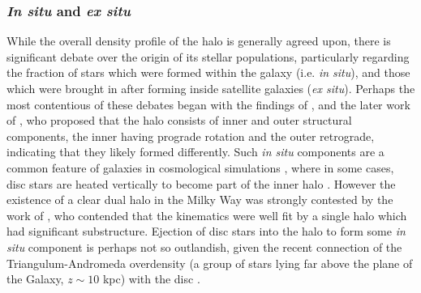 \subsubsection{\emph{In situ} and \emph{ex situ}}
While the overall density profile of the halo is generally agreed upon, there is significant debate over the origin of its stellar populations, particularly regarding the fraction of stars which were formed within the galaxy (i.e. \emph{in situ}), and those which were brought in after forming inside satellite galaxies (\emph{ex situ}). Perhaps the most contentious of these debates began with the findings of \citet{2007Natur.450.1020C}, and the later work of \citet{2012ApJ...746...34B}, who proposed that the halo consists of inner and outer structural components, the inner having prograde rotation and the outer retrograde, indicating that they likely formed differently. Such \emph{in situ} components are a common feature of galaxies in cosmological simulations \citep[e.g.][]{2011MNRAS.416.2802F,2012MNRAS.420.2245M}, where in some cases, disc stars are heated vertically to become part of the inner halo \citep[there appears to be evidence for such stars in M31, e.g.][]{2013ApJ...779..103D}. However the existence of a clear dual halo in the Milky Way was strongly contested by the work of \citet{2014ApJ...786....7S}, who contended that the kinematics were well fit by a single halo which had significant substructure. Ejection of disc stars into the halo to form some \emph{in situ} component is perhaps not so outlandish, given the recent connection of the Triangulum-Andromeda overdensity (a group of stars lying far above the plane of the Galaxy, $z \sim 10$ kpc) with the disc \citep{2015MNRAS.452..676P,2018Natur.555..334B}.

